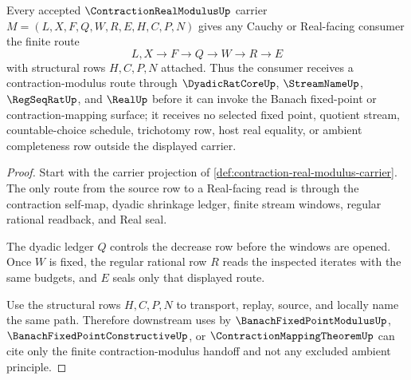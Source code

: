\begin{theorem}\label{thm:contraction-real-modulus-cauchy-real-handoff}
Every accepted $\ContractionRealModulusUp$ carrier $M=(L,X,F,Q,W,R,E,H,C,P,N)$ gives any Cauchy or Real-facing consumer the finite route
$$
L,X \longrightarrow F \longrightarrow Q \longrightarrow W \longrightarrow R \longrightarrow E
$$
with structural rows $H,C,P,N$ attached. Thus the consumer receives a contraction-modulus route through $\DyadicRatCoreUp$, $\StreamNameUp$, $\RegSeqRatUp$, and $\RealUp$ before it can invoke the Banach fixed-point or contraction-mapping surface; it receives no selected fixed point, quotient stream, countable-choice schedule, trichotomy row, host real equality, or ambient completeness row outside the displayed carrier.
\end{theorem}
\begin{proof}
Start with the carrier projection of \autoref{def:contraction-real-modulus-carrier}. The only route from the source row to a Real-facing read is through the contraction self-map, dyadic shrinkage ledger, finite stream windows, regular rational readback, and Real seal.

The dyadic ledger $Q$ controls the decrease row before the windows are opened. Once $W$ is fixed, the regular rational row $R$ reads the inspected iterates with the same budgets, and $E$ seals only that displayed route.

Use the structural rows $H,C,P,N$ to transport, replay, source, and locally name the same path. Therefore downstream uses by $\BanachFixedPointModulusUp$, $\BanachFixedPointConstructiveUp$, or $\ContractionMappingTheoremUp$ can cite only the finite contraction-modulus handoff and not any excluded ambient principle.
\end{proof}


